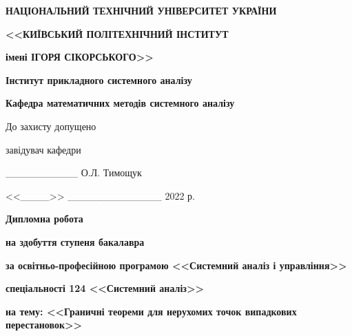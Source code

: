 \thispagestyle{empty}
\begin{center}
    {
        \textbf{НАЦІОНАЛЬНИЙ ТЕХНІЧНИЙ УНІВЕРСИТЕТ УКРАЇНИ}

        \textbf{<<КИЇВСЬКИЙ ПОЛІТЕХНІЧНИЙ ІНСТИТУТ}
        
        \textbf{імені ІГОРЯ СІКОРСЬКОГО>>}
        
        \textbf{Інститут прикладного системного аналізу}
        
        \textbf{Кафедра математичних методів системного аналізу}

    }
\end{center}

\begin{flushright}
    {
        До захисту допущено

        завідувач кафедри

        \_\_\_\_\_\_\_\_\_\_ О.Л. Тимощук

        <<\_\_\_\_>> \_\_\_\_\_\_\_\_\_\_\_\_\_ 2022 р.
    
    }
\end{flushright}
\vspace{5mm}

\begin{center}
    \textbf{\Large Дипломна робота}
    \vspace{7mm}
    {
    
        \textbf{на здобуття ступеня бакалавра}

        \textbf{за освітньо-професійною програмою <<Системний аналіз і управління>>}

        \textbf{спеціальності 124 <<Системний аналіз>>}

        \textbf{на тему: <<Граничні теореми для нерухомих точок випадкових перестановок>>}
    
    }
\end{center}
\vspace{5mm}


